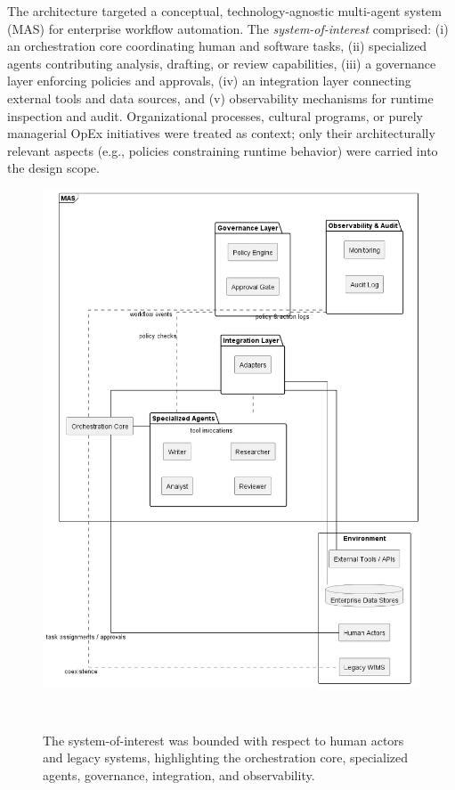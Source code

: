 The architecture targeted a conceptual, technology-agnostic multi-agent system (MAS) for enterprise workflow automation. The \emph{system-of-interest} comprised: (i) an orchestration core coordinating human and software tasks, (ii) specialized agents contributing analysis, drafting, or review capabilities, (iii) a governance layer enforcing policies and approvals, (iv) an integration layer connecting external tools and data sources, and (v) observability mechanisms for runtime inspection and audit. Organizational processes, cultural programs, or purely managerial OpEx initiatives were treated as context; only their architecturally relevant aspects (e.g., policies constraining runtime behavior) were carried into the design scope.

\begin{figure}[t]
  \centering
  \includegraphics[width=0.7\linewidth]{ressources/MAS/figures/5_1a_scope_boundary.png}
  \caption{The system-of-interest was bounded with respect to human actors and legacy systems, highlighting the orchestration core, specialized agents, governance, integration, and observability.}~\label{fig:5.1a-scope-boundary}
\end{figure}


